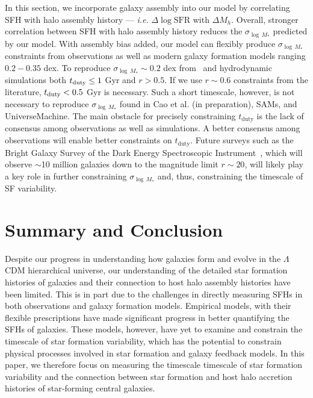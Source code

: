 \documentclass[12pt, letterpaper, preprint, tighten]{aastex62}
\newcommand{\logsfr}{\log\mathrm{SFR}}
\begin{document}
In this section, we incorporate galaxy assembly into our model by correlating 
SFH with halo assembly history --- \emph{i.e.} $\Delta\logsfr$ with $\Delta M_h$. 
Overall, stronger correlation between SFH with halo assembly history reduces
the $\sigma_{\log\,M_*}$ predicted by our model. With assembly bias added, our 
model can flexibly produce $\sigma_{\log\,M_*}$ constraints from observations 
as well as modern galaxy formation models ranging $0.2 - 0.35$ dex. To reproduce 
$\sigma_{\log\,M_*}\sim 0.2$ dex from~\cite{more2011, leauthaud2012, reddick2013, tinker2013, zu2015} 
and hydrodynamic simulations both $t_{\rm duty} \leq 1$ Gyr and $r > 0.5$. If
we use $r\sim0.6$ constraints from the literature, $t_{\rm duty} < 0.5$ Gyr is 
necessary. Such a short timescale, however, is not necessary to reproduce 
$\sigma_{\log\,M_*}$ found in Cao et al. (in preparation), SAMs, and 
{\sc UniverseMachine}. The main obstacle for precisely constraining $t_\mathrm{duty}$
is the lack of consensus among observations as well as simulations. A better consensus 
among observations will enable better constraints on $t_\mathrm{duty}$. Future surveys 
such as the Bright Galaxy Survey of the Dark Energy Spectroscopic Instrument~\citep[DESI;][]{desicollaboration2016}, 
which will observe $\sim$10 million galaxies down to the magnitude limit 
$r \sim 20$, will likely play a key role in further constraining $\sigma_{\log\,M_*}$ 
and, thus, constraining the timescale of SF variability. 

\section{Summary and Conclusion} \label{sec:summary}
Despite our progress in understanding how galaxies form and evolve in 
the $\Lambda$CDM  hierarchical universe, our understanding of the 
detailed star formation histories of galaxies and their connection to host
halo assembly histories have been limited. This is in part due to the 
challenges in directly measuring SFHs in both observations and galaxy 
formation models. Empirical models, with their flexible prescriptions 
have made significant progress in better quantifying the SFHs of galaxies. 
These models, however, have yet to examine and constrain the timescale of 
star formation variability, which has the potential to constrain physical 
processes involved in star formation and galaxy feedback models. In this 
paper, we therefore focus on  measuring the timescale timescale of star 
formation variability and the connection between star formation and host 
halo accretion histories of star-forming central galaxies. 
\end{document}
